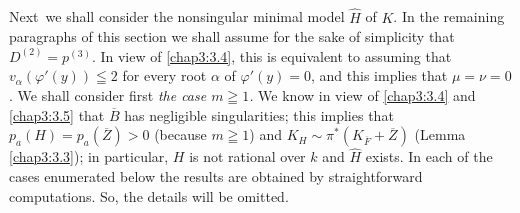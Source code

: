 \subsection{}\label{chap3:3.6}
Next\pageoriginale\ we shall consider the nonsingular minimal model
$\widehat{H}$ of $K$. In the remaining paragraphs of this section we
shall assume for the sake of simplicity that $D^{(2)}=p^{(3)}$. In
view of \ref{chap3:3.4}, this is equivalent to assuming that
$v_{\alpha}(\varphi'(y))\leqq 2$ for every root $\alpha$ of
$\varphi'(y)=0$, and this implies that $\mu=\nu=0$. We shall consider
first {\em the case $m\geqq 1$.} We know in view of \ref{chap3:3.4} and
\ref{chap3:3.5} that $\overline{B}$ has negligible singularities; this
implies that $p_{a}(H)=p_{a}(\overline{Z})>0$ (because $m\geqq 1$) and
$K_{H}\sim \pi^{\ast}(K_{\overline{F}}+\overline{Z})$ (\cf Lemma
\ref{chap3:3.3}); in particular, $H$ is not rational over $k$ and
$\widehat{H}$ exists. In each of the cases enumerated below the
results are obtained by straightforward computations. So, the details
will be omitted.

